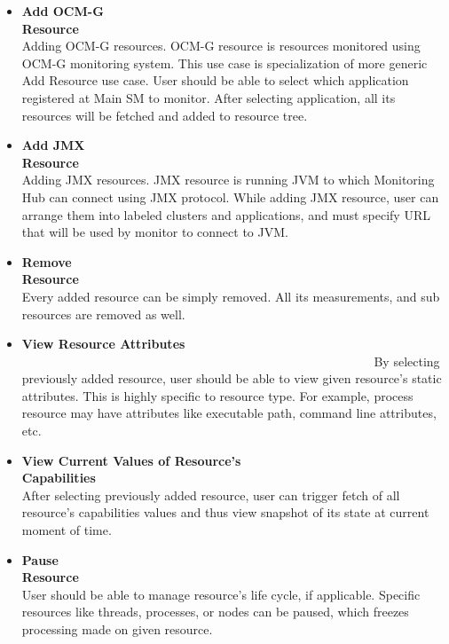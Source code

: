 \begin{itemize}
\item {\bf Add OCM-G Resource}~~~~~~~~~~~~~~~~~~~~~~~~~~~~~~~~~~~~~~~~~~~~~~~~~~~~~~~~\linebreak
Adding OCM-G resources. OCM-G resource is resources monitored using OCM-G monitoring system. This use case is specialization of more generic Add Resource use case. User should be able to select which application registered at Main SM to monitor. After selecting application, all its resources will be fetched and added to resource tree.

\item {\bf Add JMX Resource}~~~~~~~~~~~~~~~~~~~~~~~~~~~~~~~~~~~~~~~~~~~~~~~~~~~~~~~~\linebreak
Adding JMX resources. JMX resource is running JVM to which Monitoring Hub can connect using JMX protocol. While adding JMX resource, user can arrange them into labeled clusters and applications, and must specify URL that will be used by monitor to connect to JVM.

\item {\bf Remove Resource}~~~~~~~~~~~~~~~~~~~~~~~~~~~~~~~~~~~~~~~~~~~~~~~~~~~~~~~~\linebreak
Every added resource can be simply removed. All its measurements, and sub resources are removed as well.

\item {\bf View Resource Attributes} ~~~~~~~~~~~~~~~~~~~~~~~~~~~~~~~~~~~~~~~~~~~~~~~~~~~~~~~~\linebreak
By selecting previously added resource, user should be able to view given resource's static attributes. This is highly specific to resource type. For example, process resource may have attributes like executable path, command line attributes, etc.
\item {\bf View Current Values of Resource's
Capabilities}~~~~~~~~~~~~~~~~~~~~~~~~~~~~~~~~~~~~~~~~~~~~~~~~~~~~~~~~\linebreak
After selecting previously added resource, user can trigger fetch of all resource\rq{}s capabilities values and thus view snapshot of its state at current moment of time.

\item {\bf Pause Resource}~~~~~~~~~~~~~~~~~~~~~~~~~~~~~~~~~~~~~~~~~~~~~~~~~~~~~~~~\linebreak
User should be able to manage resource\rq{}s life cycle, if applicable. Specific resources like threads, processes, or nodes can be paused, which freezes processing made on given resource.


\end{itemize}
